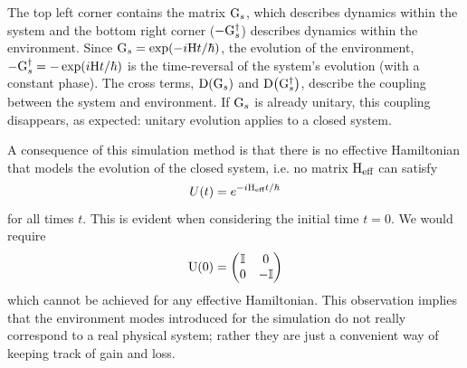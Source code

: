 The top left corner contains the matrix \(\mathrm{G}_{s}\), which describes
dynamics within the system and the bottom right corner
(\(-\mathrm{G}_{s}^{\dagger}\)) describes dynamics within the environment.
Since \(\mathrm{G}_{s}=\exp \!\left(-i\mathrm{H}t/\hbar\right)\), the evolution of the
environment, \(\mathrm{-G}_{s}^{\dagger}=-\exp \!\left(i\mathrm{H}t/\hbar\right)\) is the
time-reversal of the system's evolution (with a constant phase). The cross
terms, \(\mathrm{D} \!\left(\mathrm{G}_{s}\right)\) and \(\mathrm{D} \!\left(\mathrm{G}_{s}^{ \dagger}\right)
\), describe the coupling between the system and environment. If
\(\mathrm{G}_{s}\) is already unitary, this coupling disappears, as expected:
unitary evolution applies to a closed system.

A consequence of this simulation method is that there is no effective
Hamiltonian that models the evolution of the closed system, i.e. no matrix
\(\mathrm{H}_{\text{eff}}\) can satisfy
\begin{equation}
  U\!\left(t\right) = e^{-i\mathrm{H}_{\text{eff}}t/\hbar}
\end{equation}
for all times \(t\). This is evident when considering the initial time \(t=0\).
We would require
\begin{equation}
  \mathrm{U}\!\left(0\right) = \begin{pmatrix}
    \mathbb{I} & 0 \\
    0 & -\mathbb{I}
  \end{pmatrix}
\end{equation}
which cannot be achieved for any effective Hamiltonian. This observation implies
that the environment modes introduced for the simulation do not really
correspond to a real physical system; rather they are just a convenient way of
keeping track of gain and loss.

